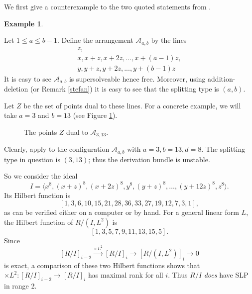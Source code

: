 \documentclass[12pt]{amsart}
\numberwithin{equation}{section}
\theoremstyle{definition}
\newtheorem{example}[theorem]{Example}
\begin{document}
We first give a  counterexample to the two quoted statements from \cite{DIV}. 

\begin{example} \label{ctrex to DIV}
 

Let $1 \leq a \leq b-1$.  Define the arrangement $\mathcal A_{a,b}$ by the lines
\[
\begin{array}{l}
	z, \\
	x, x+z, x+2z, ..., x+(a-1)z, \\
	y, y+z, y+2z, ..., y+(b-1)z 
\end{array}
\]
It is easy to see $\mathcal A_{a,b}$ is supersolveable hence free.  Moreover, using
addition-deletion  (or Remark \ref{stefan}) it is easy to see that the splitting type is $(a,b)$.

Let $Z$ be the set of points dual to these lines. For a concrete example, we will take $a=3$ and $b = 13$
(see Figure \ref{DualA3-13}).

\begin{figure}[htbp]
\begin{center}
\caption{The points $Z$ dual to $\mathcal A_{3,13}$.}
\label{DualA3-13}
\end{center}
\end{figure}

Clearly,  \cite[Propositions 7.2 and 7.4]{DIV} apply to the configuration $\mathcal A_{a,b}$ with $a=3, b=13, d=8$. 
The splitting type in question is $(3,13)$; thus the derivation bundle is unstable.

So we consider the ideal
\[
I = \langle x^8,(x+z)^8,(x+2z)^8,y^8, (y+z)^8,\dots,(y+12z)^8,z^8 \rangle.
\]
Its Hilbert function is 
\[
[1, 3, 6, 10, 15, 21, 28, 36, 33, 27, 19, 12, 7, 3, 1],
\]
as can be verified either on a computer or by hand. For a general linear form $L$, the Hilbert function of $R/(I,L^2)$ is
\[
[1, 3, 5, 7, 9, 11, 13, 15, 5].
\]
Since
\[
[R/I]_{i-2} \stackrel{\times L^2}{\longrightarrow} [R/I]_i \rightarrow [R/(I,L^2)]_i \rightarrow 0
\]
is exact, a comparison of these two Hilbert functions shows that $\times L^2 : [R/I]_{i-2} \rightarrow [R/I]_{i}$ has maximal rank for all $i$. Thus $R/I$ {\em does} have SLP in range 2.


\end{example}
\end{document}
